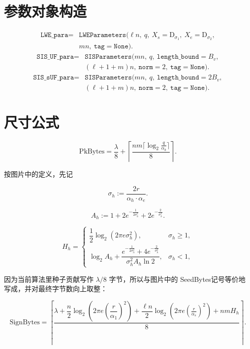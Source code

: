 \documentclass[11pt]{article}
\newcommand{\zh}[1]{{\zhfont #1}}
\begin{document}
\section*{\zh{参数对象构造}}
\[
\begin{aligned}
\texttt{LWE\_para} ={}& \texttt{LWEParameters}(\ell n,\ q,\ X_s=\mathrm{D}_{\sigma_1},\ X_e=\mathrm{D}_{\sigma_2}, \\
& mn,\ \texttt{tag}=\texttt{None}).
\end{aligned}
\]
\[
\begin{aligned}
\texttt{SIS\_UF\_para} ={}& \texttt{SISParameters}(mn,\ q,\ \texttt{length\_bound}=B_v, \\
& (\ell+1+m)n,\ \texttt{norm}=2,\ \texttt{tag}=\texttt{None}).
\end{aligned}
\]
\[
\begin{aligned}
\texttt{SIS\_sUF\_para} ={}& \texttt{SISParameters}(mn,\ q,\ \texttt{length\_bound}=2B_v, \\
& (\ell+1+m)n,\ \texttt{norm}=2,\ \texttt{tag}=\texttt{None}).
\end{aligned}
\]

\section*{\zh{尺寸公式}}
\[
\mathrm{PkBytes} = \frac{\lambda}{8} + \left\lceil\frac{nm\lceil\log_2 \frac{q}{\alpha_b}\rceil}{8}\right\rceil.
\]

{\zhfont 按图片中的定义，先记}

\[
\sigma_h := \frac{2r}{\alpha_h \cdot \alpha_e}.
\]

\[
A_h := 1 + 2e^{-\frac{1}{2\sigma_h^2}} + 2e^{-\frac{2}{\sigma_h^2}}.
\]

\[
H_h=
\begin{cases}
\dfrac12\log_2\!\left(2\pi e\sigma_h^2\right), & \sigma_h\ge 1,\\[0.9em]
\log_2 A_h + \dfrac{e^{-\frac{1}{2\sigma_h^2}} + 4e^{-\frac{2}{\sigma_h^2}}}{\sigma_h^2 A_h \ln 2}, & \sigma_h<1,
\end{cases}
\]

{\zhfont 因为当前算法里种子贡献写作 $\lambda/8$ 字节，所以与图片中的 }SeedBytes{\zhfont 记号等价地写成，并对最终字节数向上取整：}

\[
\mathrm{SignBytes} = \left\lceil \frac{\lambda + \dfrac{n}{2}\log_2\!\left(2\pi e\left(\dfrac{r}{\alpha_1}\right)^2\right) + \dfrac{\ell n}{2}\log_2\!\left(2\pi e (\frac{r}{\alpha_s})^2\right) + nmH_h}{8} \right\rceil.
\]
\end{document}
